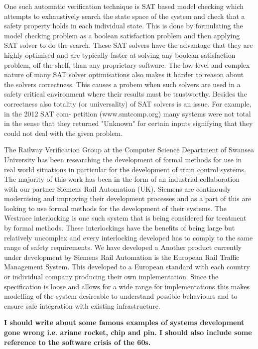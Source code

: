 One such automatic verification technique is SAT based model checking which attempts to exhaustively search the state space of the system and check that a safety property holds in each individual state. This is done by formulating the model checking problem as a boolean satisfaction problem and then applying SAT solver to do the search. These SAT solvers have the advantage that they are highly optimised and are typically faster at solving any boolean satisfaction problem, off the shelf, than any proprietary software. The low level and complex nature of many SAT solver optimisations also makes it harder to reason about the solvers correctness. This causes a probem when such solvers are used in a safety critical environment where their results must be trustworthy. Besides the correctness also
totality (or universality) of SAT solvers is an issue. For example, in the 2012 SAT com-
petition (www.smtcomp.org) many systems were not total in the sense that they returned
"Unknown" for certain inputs signifying that they could not deal with the given problem. 

The Railway Verification Group at the Computer Science Department of Swansea University has been researching the development of formal methods for use in real world situations in particular for the development of train control systems. The majority of this work has been in the form of an industrial collaboration with our partner Siemens Rail Automation (UK). Siemens are continously modernising and improving their development processes and as a part of this are looking to use formal methods for the development of their systems. The Westrace interlocking is one such system that is being considered for treatment by formal methods. These interlockings have the benefits of being large but relatively uncomplex and every interlocking developed has to comply to the same range of safety requirements.  We have developed a Another product currently under development by Siemens Rail Automation is the European Rail Traffic Management System. This developed to a European  standard with each country or individual company producing their own implementation. Since the specification is loose and allows for a wide range for implementations this makes modelling of the system desireable to understand possible behaviours and to ensure safe integration with existing infrastructure.

\textbf{I should write about some famous examples of systems development gone wrong i.e. ariane rocket, chip and pin. I should also include some reference to the software crisis of the 60s.} \cite{GL97}

